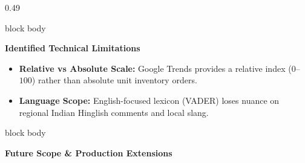 \documentclass[aspectratio=169, 10pt]{beamer}
\newenvironment{card}[1][]{%
        \begin{beamercolorbox}[rounded=true,shadow=false,wd=\linewidth,sep=3.5pt,#1]{block body}%
        \fontsize{7.8pt}{9.8pt}\selectfont%
    }{%
        \end{beamercolorbox}%
    }
\begin{document}
\begin{frame}[t]
\begin{columns}[T]
            \begin{column}{0.49\textwidth}                                                                                                                                                             
                \begin{card}                                                                                                                                                                           
                    {\fontsize{8pt}{9.5pt}\selectfont \textbf{\color{CoralAccent}Identified Technical Limitations}}\\[0.06cm]                                                                          
                    \begin{itemize}\setlength{\itemsep}{2pt}                                                                                                                                           
                        \item \textbf{Relative vs Absolute Scale:} Google Trends provides a relative index ($0$--$100$) rather than absolute unit inventory orders.                                    
                        \item \textbf{Language Scope:} English-focused lexicon (VADER) loses nuance on regional Indian Hinglish comments and local slang.                                              
                    \end{itemize}                                                                                                                                                                      
                \end{card}                                                                                                                                                                             
                \vspace{0.12cm}                                                                                                                                                                        
                \begin{card}                                                                                                                                                                           
                    {\fontsize{8pt}{9.5pt}\selectfont \textbf{\color{BlueAccent}Future Scope \& Production Extensions}}\\[0.06cm]                                                                      

\end{card}
\end{column}
\end{columns}
\end{frame}
\end{document}
